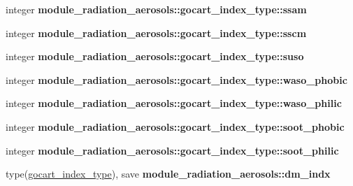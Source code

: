 \begin{DoxyCompactItemize}
\item 
\mbox{\label{group__module__radiation__aerosols_ga911c3dc2e5722a38166950003a4d0875}} 
integer {\bfseries module\+\_\+radiation\+\_\+aerosols\+::gocart\+\_\+index\+\_\+type\+::ssam}
\item 
\mbox{\label{group__module__radiation__aerosols_ga814b63e33cdf9c3e1e470406056a9fcb}} 
integer {\bfseries module\+\_\+radiation\+\_\+aerosols\+::gocart\+\_\+index\+\_\+type\+::sscm}
\item 
\mbox{\label{group__module__radiation__aerosols_ga1556732edff9dba1d6593a1117af056f}} 
integer {\bfseries module\+\_\+radiation\+\_\+aerosols\+::gocart\+\_\+index\+\_\+type\+::suso}
\item 
\mbox{\label{group__module__radiation__aerosols_ga9975caaff0c49d25180699beb469601f}} 
integer {\bfseries module\+\_\+radiation\+\_\+aerosols\+::gocart\+\_\+index\+\_\+type\+::waso\+\_\+phobic}
\item 
\mbox{\label{group__module__radiation__aerosols_ga05425c83c167f7820a126c72e561a4da}} 
integer {\bfseries module\+\_\+radiation\+\_\+aerosols\+::gocart\+\_\+index\+\_\+type\+::waso\+\_\+philic}
\item 
\mbox{\label{group__module__radiation__aerosols_gabe87221aca998b4d7ca231525e7dc355}} 
integer {\bfseries module\+\_\+radiation\+\_\+aerosols\+::gocart\+\_\+index\+\_\+type\+::soot\+\_\+phobic}
\item 
\mbox{\label{group__module__radiation__aerosols_gac382ab82531e2f1cb6021b786666f004}} 
integer {\bfseries module\+\_\+radiation\+\_\+aerosols\+::gocart\+\_\+index\+\_\+type\+::soot\+\_\+philic}
\item 
\mbox{\label{group__module__radiation__aerosols_ga70c58693c0aac6e4dbb6cf425fb0ce6a}} 
type(\hyperlink{structmodule__radiation__aerosols_1_1gocart__index__type}{gocart\+\_\+index\+\_\+type}), save {\bfseries module\+\_\+radiation\+\_\+aerosols\+::dm\+\_\+indx}

\end{DoxyCompactItemize}
